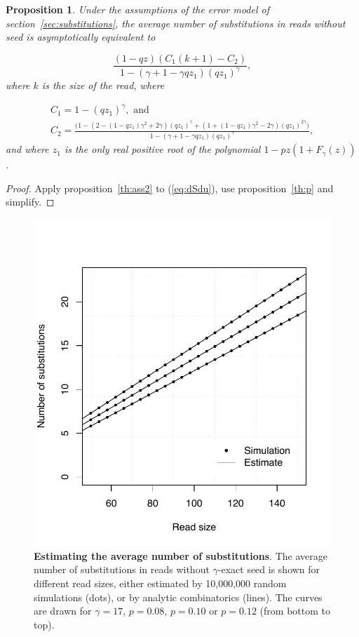 \documentclass{article}
\newtheorem{proposition}{Proposition}
\begin{document}
\begin{proposition}
\label{th:avsub}
Under the assumptions of the error model of
section~\ref{sec:substitutions}, the average number of substitutions in
reads without seed is asymptotically equivalent to

\begin{equation*}
\frac{(1-qz)(C_1(k+1) - C_2)}{1-(\gamma+1-\gamma qz_1)(qz_1)^\gamma},
\end{equation*}
where $k$ is the size of the read, where

\begin{gather*}
C_1 = 1-(qz_1)^\gamma, \text{ and} \\
C_2 = \frac{
\big(1-(2-(1-qz_1)\gamma^2+2\gamma)(qz_1)^\gamma+
(1+(1-qz_1)\gamma^2-2\gamma)(qz_1)^{2\gamma} \big)}
{1-(\gamma+1-\gamma qz_1)(qz_1)^\gamma},
\end{gather*}
and where $z_1$ is the only real positive root of the polynomial
$1-pz(1+F_\gamma(z))$.
\end{proposition}

\begin{proof}
Apply proposition~\ref{th:ass2} to (\ref{eq:dSdu}), use
proposition~\ref{th:p} and simplify.
\end{proof}


\begin{figure}[h]
\centering
\includegraphics[scale=0.445]{simulp-average.pdf}
\caption{\textbf{Estimating the average number of substitutions}. The
average number of substitutions in reads without $\gamma$-exact seed is
shown for different read sizes, either estimated by 10,000,000 random
simulations (dots), or by analytic combinatorics (lines). The curves are
drawn for $\gamma=17$, $p=0.08$, $p=0.10$ or $p=0.12$ (from bottom to
top).}
\label{fig:simulavsub}
\end{figure}
\end{document}
